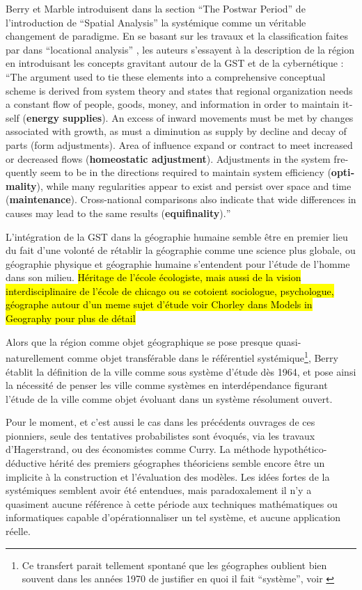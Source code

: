 Berry et Marble introduisent dans la section \foreignquote{english}{The Postwar Period} de l'introduction de \foreignquote{english}{Spatial Analysis} la systémique comme un véritable changement de paradigme. En se basant sur les travaux et la classification faites par \textcite{Haggett1965} dans \foreignquote{english}{locational analysis} , les auteurs s'essayent à la description de la région en introduisant les concepts gravitant autour de la GST et de la cybernétique : \foreignquote{english}{The argument used to tie these elements into a comprehensive conceptual scheme is derived from system theory and states that regional organization needs a constant flow of people, goods, money, and information in order to maintain itself (\textbf{energy supplies}). An excess of inward movements must be met by changes associated with growth, as must a diminution as supply by decline and decay of parts (form adjustments). Area of influence expand or contract to meet increased or decreased flows (\textbf{homeostatic adjustment}). Adjustments in the system frequently seem to be in the directions required to maintain system efficiency (\textbf{optimality}), while many regularities appear to exist and persist over space and time (\textbf{maintenance}). Cross-national comparisons also indicate that wide differences in causes may lead to the same results (\textbf{equifinality}).}

L'intégration de la GST dans la géographie humaine semble être en premier lieu du fait d'une volonté de rétablir la géographie comme une science plus globale, ou géographie physique et géographie humaine s'entendent pour l'étude de l'homme dans son milieu. \hl{Héritage de l'école écologiste, mais aussi de la vision interdisciplinaire de l'école de chicago ou se cotoient sociologue, psychologue, géographe autour d'un meme sujet d'étude voir Chorley dans Models in Geography pour plus de détail}

Alors que la région comme objet géographique se pose presque quasi-naturellement comme objet transférable dans le référentiel systémique\footnote{Ce transfert parait tellement spontané que les géographes oublient bien souvent dans les années 1970 de justifier en quoi il fait \enquote{système}, voir \autocite{Orain2001}}, Berry établit la définition de la ville comme sous système d'étude dès 1964, et pose ainsi la nécessité de penser les ville comme systèmes en interdépendance figurant l'étude de la ville comme objet évoluant dans un système résolument ouvert. 

Pour le moment, et c'est aussi le cas dans les précédents ouvrages de ces pionniers, seule des tentatives probabilistes sont évoqués, via les travaux d'Hagerstrand, ou des économistes comme Curry. La méthode hypothético-déductive hérité des premiers géographes théoriciens semble encore être un implicite à la construction et l'évaluation des modèles. Les idées fortes de la systémiques semblent avoir été entendues, mais paradoxalement il n'y a quasiment aucune référence à cette période aux techniques mathématiques ou informatiques capable d’opérationnaliser un tel système, et aucune application réelle. \autocite[467-468]{Harvey1969}

